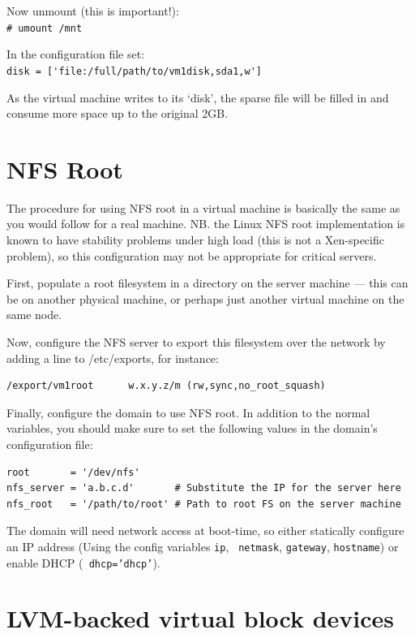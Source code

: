 \documentclass[11pt,twoside,final,openright]{xenstyle}
\begin{document}
Now unmount (this is important!):\\
\verb_# umount /mnt_

In the configuration file set:\\
\verb_disk = ['file:/full/path/to/vm1disk,sda1,w']_

As the virtual machine writes to its `disk', the sparse file will be
filled in and consume more space up to the original 2GB.

\section{NFS Root}

The procedure for using NFS root in a virtual machine is basically the
same as you would follow for a real machine.  NB. the Linux NFS root
implementation is known to have stability problems under high load
(this is not a Xen-specific problem), so this configuration may not be
appropriate for critical servers.

First, populate a root filesystem in a directory on the server machine
--- this can be on another physical machine, or perhaps just another
virtual machine on the same node.

Now, configure the NFS server to export this filesystem over the
network by adding a line to /etc/exports, for instance:

\begin{verbatim}
/export/vm1root      w.x.y.z/m (rw,sync,no_root_squash)
\end{verbatim}

Finally, configure the domain to use NFS root.  In addition to the
normal variables, you should make sure to set the following values in
the domain's configuration file:

\begin{verbatim}
root       = '/dev/nfs'
nfs_server = 'a.b.c.d'       # Substitute the IP for the server here
nfs_root   = '/path/to/root' # Path to root FS on the server machine
\end{verbatim}

The domain will need network access at boot-time, so either statically
configure an IP address (Using the config variables {\tt ip}, {\tt
netmask}, {\tt gateway}, {\tt hostname}) or enable DHCP ({\tt
dhcp='dhcp'}).

\section{LVM-backed virtual block devices}
\end{document}
